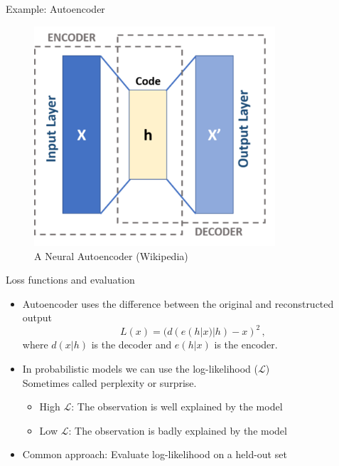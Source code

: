 \documentclass[10pt]{beamer}
\begin{document}
\begin{frame}{Example: Autoencoder}

\begin{figure}[h]
\centering
\includegraphics[width=0.8\textwidth]{fig/440px-Autoencoder_schema.png}
\caption{A Neural Autoencoder (Wikipedia)}
\end{figure}

\end{frame}

\begin{frame}{Loss functions and evaluation}
\begin{itemize}
\item Autoencoder uses the difference between the original and reconstructed output
\[
L(x) = (d(e(h|x)|h) - x)^2\,,
\]
where $d(x|h)$ is the decoder and $e(h|x)$ is the encoder.\pause
\item In probabilistic models we can use the log-likelihood ($\mathcal{L}$) \\ Sometimes called {\color{uured} perplexity} or {\color{uured} surprise}.
\begin{itemize}
\item {\color{uured} High} $\mathcal{L}$: The observation is {\color{uured} well} explained by the model
\item {\color{uured} Low} $\mathcal{L}$: The observation is {\color{uured} badly} explained by the model
\end{itemize}
\item Common approach: Evaluate log-likelihood on a held-out set
\end{itemize}

\end{frame}
\end{document}
